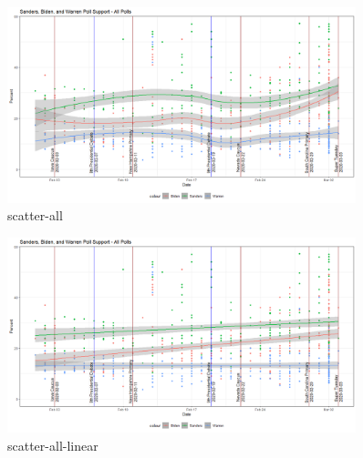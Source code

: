 \begin{figure}[H]
    \centering
    \includegraphics[width=0.9\textwidth]{figures/scatter-all.png}
    \caption{scatter-all}
    \label{scatter-all}
\end{figure}

\begin{figure}[H]
    \centering
    \includegraphics[width=0.9\textwidth]{figures/scatter-all-linear.png}
    \caption{scatter-all-linear}
    \label{scatter-all-linear}
\end{figure}

